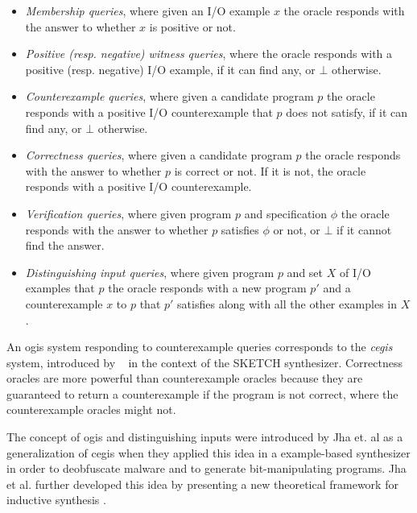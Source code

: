 \begin{itemize}
\item \textit{Membership queries}, where given an I/O example $x$ the oracle
  responds with the answer to whether $x$ is positive or not.
\item \textit{Positive (resp. negative) witness queries}, where the oracle
  responds with a positive (resp. negative) I/O example, if it can find any, or
  $\bot$ otherwise.
\item \textit{Counterexample queries}, where given a candidate program $p$ the
  oracle responds with a positive I/O counterexample that $p$ does not satisfy,
  if it can find any, or $\bot$ otherwise.
\item \textit{Correctness queries}, where given a candidate program $p$ the
  oracle responds with the answer to whether $p$ is correct or not. If it is not,
  the oracle responds with a positive I/O counterexample.
\item \textit{Verification queries}, where given program $p$ and specification
  $\phi$ the oracle responds with the answer to whether $p$ satisfies $\phi$ or
  not, or $\bot$ if it cannot find the answer.
\item \textit{Distinguishing input queries}, where given program $p$ and set $X$
  of I/O examples that $p$  the oracle responds with a new program $p'$ and a
  counterexample $x$ to $p$ that $p'$ satisfies along with all the other
  examples in $X$.
\end{itemize}

An \gls{ogis} system responding to counterexample queries corresponds to the
\textit{\gls{cegis}} system, introduced by \citeauthor{Solar-Lezama:2008}
~\cite{Solar-Lezama:2008} in the context of the SKETCH synthesizer. Correctness
oracles are more powerful than counterexample oracles because they are
guaranteed to return a counterexample if the program is not correct, where the
counterexample oracles might not.

The concept of \gls{ogis} and distinguishing inputs were introduced by Jha et.
al \cite{Jha:2017:TFS} as a generalization of \gls{cegis} when they applied
this idea in a example-based synthesizer in order to deobfuscate malware and to
generate bit-manipulating programs. Jha et al. further developed this idea by
presenting a new theoretical framework for inductive synthesis
\cite{Jha:2017:TFS}.

